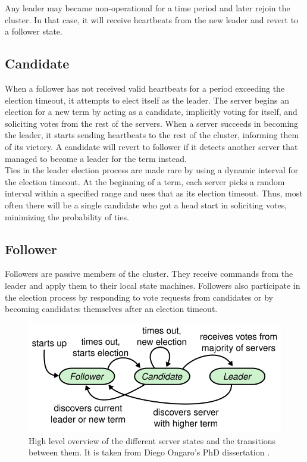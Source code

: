 Any leader may became non-operational for a time period and later rejoin the cluster. In that case, it will receive heartbeats from the new leader and revert to a follower state.

\subsection{Candidate}

When a follower has not received valid heartbeats for a period exceeding the election timeout, it attempts to elect itself as the leader. The server begins an election for a new term by acting as a candidate, implicitly voting for itself, and soliciting votes from the rest of the servers. When a server succeeds in becoming the leader, it starts sending heartbeats to the rest of the cluster, informing them of its victory. A candidate will revert to follower if it detects another server that managed to become a leader for the term instead.\\

Ties in the leader election process are made rare by using a dynamic interval for the election timeout. At the beginning of a term, each server picks a random interval within a specified range and uses that as its election timeout. Thus, most often there will be a single candidate who got a head start in soliciting votes, minimizing the probability of ties.\\

\subsection{Follower}

Followers are passive members of the cluster. They receive commands from the leader and apply them to their local state machines. Followers also participate in the election process by responding to vote requests from candidates or by becoming candidates themselves after an election timeout.

\begin{figure}[ht]
  \centering
  \includegraphics[width=400pt]{images/followercandidateleader.png}
  \caption{High level overview of the different server states and the transitions between them. It is taken from Diego Ongaro's PhD dissertation \cite{raft}.}
  \label{fig:raft-states-transitions}
\end{figure}

